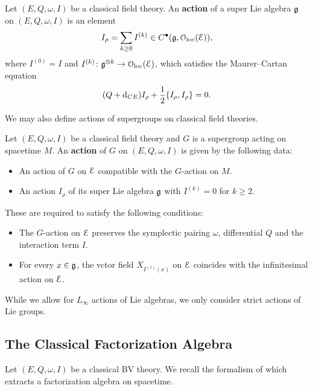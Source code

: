 \documentclass[10pt, oneside]{article}
\begin{document}
\begin{definition}
\label{infinitesimal_action_def}
Let $(E, Q,\omega, I)$ be a classical field theory. An {\bf action} of a super Lie algebra $\mathfrak g$ on $(E, Q, \omega, I)$ is an element
\[I_{\rho} = \sum_{k\geq 0} I^{(k)}\in C^\bullet(\mathfrak g, \mathcal{O}_{\rm loc}(\mathcal E)),\]
where $I^{(0)} = I$ and $I^{(k)}\colon \mathfrak g^{\otimes k}\rightarrow \mathcal{O}_{\rm loc}(\mathcal E)$, which satisfies the Maurer--Cartan equation
\[(Q + {\rm d}_{CE}) I_\rho + \frac{1}{2} \{I_\rho, I_\rho\} = 0.\]
\end{definition}

We may also define actions of supergroups on classical field theories.

\begin{definition}
\label{group_action_def}
Let $(E, Q, \omega, I)$ be a classical field theory and $G$ is a supergroup acting on spacetime $M$. An {\bf action} of $G$ on $(E, Q, \omega, I)$ is given by the following data:
\begin{itemize}
\item An action of $G$ on $\mathcal E$ compatible with the $G$-action on $M$.

\item An action $I_\rho$ of its super Lie algebra $\mathfrak g$ with $I^{(k)} = 0$ for $k\geq 2$.
\end{itemize}
These are required to satisfy the following conditions:
\begin{itemize}
\item The $G$-action on $\mathcal E$ preserves the symplectic pairing $\omega$, differential $Q$ and the interaction term $I$.

\item For every $x\in\mathfrak g$, the vctor field $X_{I^{(1)}(x)}$ on $\mathcal E$ coincides with the infinitesimal action on $\mathcal E$.
\end{itemize}
\end{definition}

\begin{remark}
While we allow for $L_\infty$ actions of Lie algebras, we only consider strict actions of Lie groups.
\end{remark}

\subsection{The Classical Factorization Algebra}

Let $(E, Q, \omega, I)$ be a classical BV theory. We recall the formalism of \cite{Book1,Book2} which extracts a factorization algebra on spacetime.
\end{document}

